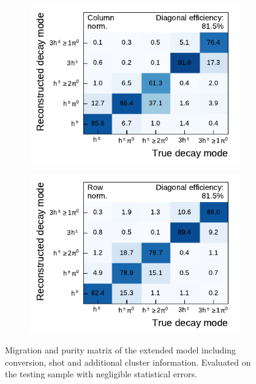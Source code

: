\begin{figure}[htb]
  \begin{subfigure}{0.48\textwidth}
    \centering
    \includegraphics{./figures/decay_mode_classification/combined_sub_e_moments_shots_conv_ptcut_1_5/mig_mat.pdf}
  \end{subfigure}\hfill
  \begin{subfigure}{0.48\textwidth}
    \centering
    \includegraphics{./figures/decay_mode_classification/combined_sub_e_moments_shots_conv_ptcut_1_5/comp_mat.pdf}
  \end{subfigure}
  \caption{Migration and purity matrix of the extended model including
    conversion, shot and additional cluster information. Evaluated on the
    testing sample with negligible statistical errors.}
  \label{fig:decay_mode_combined}
\end{figure}

